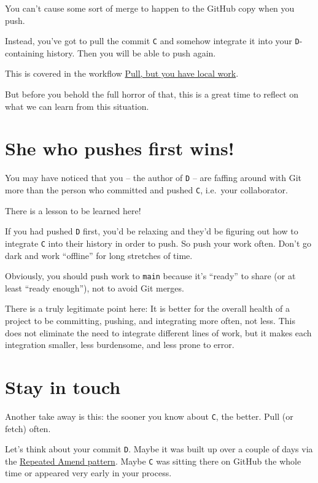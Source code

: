 \documentclass[
]{book}
\begin{document}
You can't cause some sort of merge to happen to the GitHub copy when you push.

Instead, you've got to pull the commit \texttt{C} and somehow integrate it into your \texttt{D}-containing history. Then you will be able to push again.

This is covered in the workflow \hyperref[pull-tricky]{Pull, but you have local work}.

But before you behold the full horror of that, this is a great time to reflect on what we can learn from this situation.

\section{She who pushes first wins!}\label{she-who-pushes-first-wins}

You may have noticed that you -- the author of \texttt{D} -- are faffing around with Git more than the person who committed and pushed \texttt{C}, i.e.~your collaborator.

There is a lesson to be learned here!

If you had pushed \texttt{D} first, you'd be relaxing and they'd be figuring out how to integrate \texttt{C} into their history in order to push. So push your work often. Don't go dark and work ``offline'' for long stretches of time.

Obviously, you should push work to \texttt{main} because it's ``ready'' to share (or at least ``ready enough''), not to avoid Git merges.

There is a truly legitimate point here: It is better for the overall health of a project to be committing, pushing, and integrating more often, not less. This does not eliminate the need to integrate different lines of work, but it makes each integration smaller, less burdensome, and less prone to error.

\section{Stay in touch}\label{stay-in-touch}

Another take away is this: the sooner you know about \texttt{C}, the better. Pull (or fetch) often.

Let's think about your commit \texttt{D}. Maybe it was built up over a couple of days via the \hyperref[repeated-amend]{Repeated Amend pattern}. Maybe \texttt{C} was sitting there on GitHub the whole time or appeared very early in your process.
\end{document}
